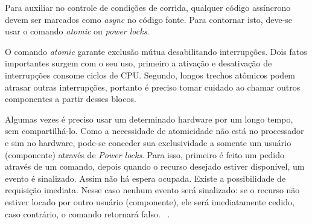 Para auxiliar no controle de condições de corrida, qualquer código assíncrono devem ser marcados como \textit{async} no código fonte. 
Para contornar isto, deve-se usar o comando \textit{atomic} ou \textit{power locks}.

O comando \textit{atomic} garante exclusão mútua desabilitando interrupções. Dois fatos
importantes surgem com o seu uso, primeiro a ativação e desativação de interrupções consome ciclos de CPU. Segundo,
longos trechos atômicos podem atrasar outras interrupções, portanto é preciso tomar cuidado ao chamar outros componentes
a partir desses blocos.

Algumas vezes é preciso usar um determinado hardware por um longo tempo, sem compartilhá-lo. 
Como a necessidade de atomicidade não está no processador e sim no hardware, 
pode-se conceder sua exclusividade a somente um usuário (componente) através de
\textit{Power locks}. Para isso, primeiro é feito um pedido através de um comando, depois quando o recurso desejado
estiver disponível, um evento é sinalizado. Assim não há espera ocupada. 
Existe a possibilidade de requisição imediata. 
Nesse caso nenhum evento será sinalizado: se o recurso não estiver locado por outro usuário (componente), ele será
imediatamente cedido, caso contrário, o comando retornará falso. 
~\cite[Cap.11]{LevisGay/09}.


